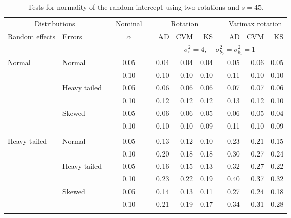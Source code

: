 \begin{table}[ht]
\caption{\label{tab:simb045}Tests for normality of the random intercept using two rotations and $s = 45$.}
\begin{scriptsize}
\begin{center}
\begin{tabular}{ll p{.1cm} c p{.1cm} rrr p{.1cm} rrr}
  \hline
  \multicolumn{2}{c}{Distributions}& & Nominal & &  \multicolumn{3}{c}{Rotation} & & \multicolumn{3}{c}{Varimax rotation} \\ \cline{1-2} \cline{6-8} \cline{10-12}   
  Random effects & Errors & & $\alpha$ & & AD & CVM & KS & & AD & CVM & KS \\ 
   \hline
& && && \multicolumn{7}{c}{$\sigma_{\varepsilon}^2 = 4$, \ \ $\sigma_{b_0}^2 = \sigma_{b_1}^2 = 1$} \\ \cline{6-12}
\rowcolor{gray!20}Normal       & Normal       && 0.05 &&   0.04 & 0.04 & 0.04 && 0.05 & 0.06 & 0.05 \\ 
\rowcolor{gray!20}             &              && 0.10 &&   0.10 & 0.10 & 0.10 && 0.11 & 0.10 & 0.10 \\ 
\rowcolor{gray!20}             & Heavy tailed && 0.05 &&   0.06 & 0.06 & 0.06 && 0.07 & 0.07 & 0.06 \\ 
\rowcolor{gray!20}             &              && 0.10 &&   0.12 & 0.12 & 0.12 && 0.13 & 0.12 & 0.10 \\ 
\rowcolor{gray!20}             & Skewed       && 0.05 &&   0.06 & 0.06 & 0.05 && 0.06 & 0.05 & 0.04 \\ 
\rowcolor{gray!20}             &              && 0.10 &&   0.10 & 0.10 & 0.09 && 0.11 & 0.10 & 0.09 \\ 
             &&&&&&&&&&&\\
Heavy tailed & Normal       && 0.05 &&   0.13 & 0.12 & 0.10 && 0.23 & 0.21 & 0.15 \\ 
             &              && 0.10 &&   0.20 & 0.18 & 0.18 && 0.30 & 0.27 & 0.24 \\ 
             & Heavy tailed && 0.05 &&   0.16 & 0.15 & 0.13 && 0.32 & 0.27 & 0.22 \\ 
             &              && 0.10 &&   0.23 & 0.22 & 0.19 && 0.40 & 0.37 & 0.32 \\ 
             & Skewed       && 0.05 &&   0.14 & 0.13 & 0.11 && 0.27 & 0.24 & 0.18 \\ 
             &              && 0.10 &&   0.21 & 0.19 & 0.17 && 0.34 & 0.31 & 0.28 \\ 
             &&&&&&&&&&&\\

\end{tabular}
\end{center}
\end{scriptsize}
\end{table}
